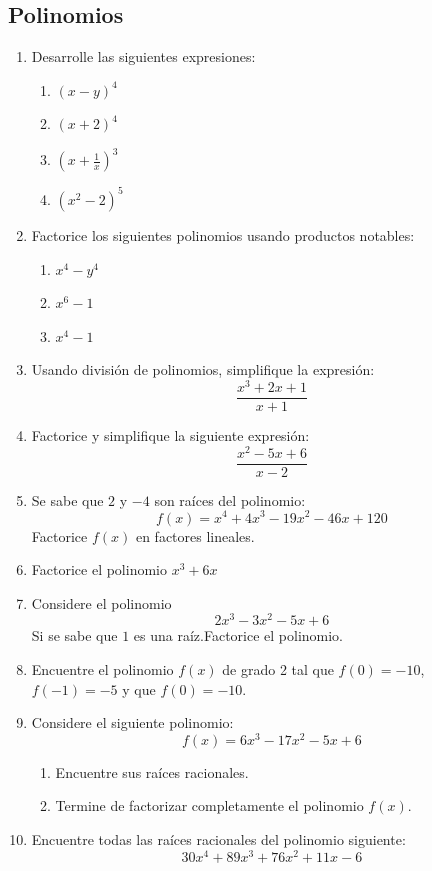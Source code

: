 \documentclass[11pt, twoside]{book}%
\begin{document}
\subsection*{Polinomios}
\begin{enumerate}
    \item Desarrolle las siguientes expresiones:
        \begin{enumerate}
            \item \((x-y)^4\)
            \item \((x+2)^4\)
            \item \(\left(x+\frac{1}{x}\right)^3\)
            \item \((x^2-2)^5\)
        \end{enumerate}
    \item Factorice los siguientes polinomios usando productos notables:
            \begin{enumerate}
                \item \(x^4-y^4\)
                \item \(x^6-1\)
                \item \(x^4-1\)
            \end{enumerate}
    \item Usando división de polinomios, simplifique la expresión:
        \[\frac{x^3+2x+1}{x+1}\]
    \item Factorice y simplifique la siguiente expresión:
        \[\frac{x^2-5x+6}{x-2}\]
    \item Se sabe que \(2\) y \(-4\) son raíces del polinomio:
        \[f(x)=x^4+4x^3-19x^2-46x+120\]
        Factorice \(f(x)\) en factores lineales.
    \item Factorice el polinomio
        \(x^3+6x\)
    \item Considere el polinomio
        \[2x^3-3x^2-5x+6\]
        Si se sabe que \(1\) es una raíz.Factorice el polinomio.
    \item Encuentre el polinomio \(f(x)\) de grado 2 tal que \(f(0)=-10\), \(f(-1)=-5\) y que \(f(0)=-10\).
    \item Considere el siguiente polinomio:
        \[f(x)=6x^3-17x^2-5x+6\]
        \begin{enumerate}
            \item Encuentre sus raíces racionales.
            \item Termine de factorizar completamente el polinomio \(f(x)\).
        \end{enumerate}
    \item Encuentre todas las raíces racionales del polinomio siguiente:
        \[30x^4 + 89x^3 + 76x^2 + 11x - 6\]
\end{enumerate}
\end{document}
